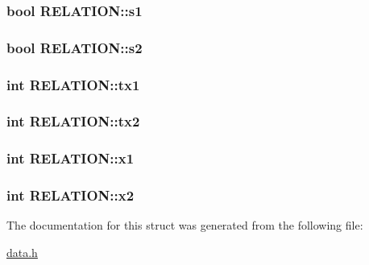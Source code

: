 \hypertarget{struct_r_e_l_a_t_i_o_n_2ac328d5779e9ec4e2acdbb1d3dd7117}{
\subsubsection[{s1}]{\setlength{\rightskip}{0pt plus 5cm}bool {\bf RELATION::s1}}}
\label{struct_r_e_l_a_t_i_o_n_2ac328d5779e9ec4e2acdbb1d3dd7117}


\hypertarget{struct_r_e_l_a_t_i_o_n_e32f6b4cf22feedaae833293c8b011fc}{
\subsubsection[{s2}]{\setlength{\rightskip}{0pt plus 5cm}bool {\bf RELATION::s2}}}
\label{struct_r_e_l_a_t_i_o_n_e32f6b4cf22feedaae833293c8b011fc}


\hypertarget{struct_r_e_l_a_t_i_o_n_52cc203721e55dbfd14c9dcc8a7257ba}{
\subsubsection[{tx1}]{\setlength{\rightskip}{0pt plus 5cm}int {\bf RELATION::tx1}}}
\label{struct_r_e_l_a_t_i_o_n_52cc203721e55dbfd14c9dcc8a7257ba}


\hypertarget{struct_r_e_l_a_t_i_o_n_fcc821a6adc44b264a6c7e626e3b28ec}{
\subsubsection[{tx2}]{\setlength{\rightskip}{0pt plus 5cm}int {\bf RELATION::tx2}}}
\label{struct_r_e_l_a_t_i_o_n_fcc821a6adc44b264a6c7e626e3b28ec}


\hypertarget{struct_r_e_l_a_t_i_o_n_828d3641ed3c80772dce2e3b2d40ec44}{
\subsubsection[{x1}]{\setlength{\rightskip}{0pt plus 5cm}int {\bf RELATION::x1}}}
\label{struct_r_e_l_a_t_i_o_n_828d3641ed3c80772dce2e3b2d40ec44}


\hypertarget{struct_r_e_l_a_t_i_o_n_729fed1d19fef0721d5dc9ceb262433b}{
\subsubsection[{x2}]{\setlength{\rightskip}{0pt plus 5cm}int {\bf RELATION::x2}}}
\label{struct_r_e_l_a_t_i_o_n_729fed1d19fef0721d5dc9ceb262433b}




The documentation for this struct was generated from the following file:\begin{CompactItemize}
\item 
\hyperlink{data_8h}{data.h}\end{CompactItemize}
